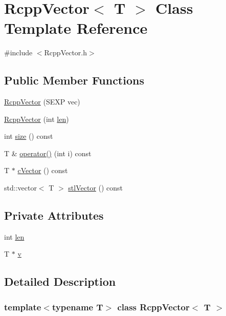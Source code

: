 \hypertarget{classRcppVector}{
\section{RcppVector$<$ T $>$ Class Template Reference}
\label{classRcppVector}
}


{\ttfamily \#include $<$RcppVector.h$>$}\subsection*{Public Member Functions}
\begin{DoxyCompactItemize}
\item 
\hyperlink{classRcppVector_a0925b350f636a546e58ad0329786500a}{RcppVector} (SEXP vec)
\item 
\hyperlink{classRcppVector_aeb7797ca2b2ac2d03fee0a543993f17b}{RcppVector} (int \hyperlink{classRcppVector_a733f5ed23ade0723338904f9f08457d6}{len})
\item 
int \hyperlink{classRcppVector_abf02690969a4dfcb8c1abedd7f36814f}{size} () const 
\item 
T \& \hyperlink{classRcppVector_ad68c84b52ed7bfcd6c71fe1f2ef92010}{operator()} (int i) const 
\item 
T $\ast$ \hyperlink{classRcppVector_a5cf66a342593e509bb4a545305a1327e}{cVector} () const 
\item 
std::vector$<$ T $>$ \hyperlink{classRcppVector_af40d2a7f0132330eb8c15ea4e42f4aa9}{stlVector} () const 
\end{DoxyCompactItemize}
\subsection*{Private Attributes}
\begin{DoxyCompactItemize}
\item 
int \hyperlink{classRcppVector_a733f5ed23ade0723338904f9f08457d6}{len}
\item 
T $\ast$ \hyperlink{classRcppVector_ac810c53db4c1b978bada104b38484b26}{v}
\end{DoxyCompactItemize}


\subsection{Detailed Description}
\subsubsection*{template$<$typename T$>$ class RcppVector$<$ T $>$}



